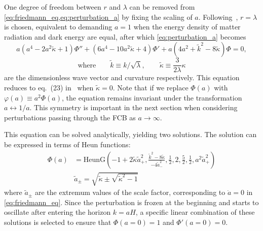 \documentclass[%
 reprint,
 amsmath,amssymb,
 prl,
]{revtex4-2}
\begin{document}
One degree of freedom between \(r\) and \(\lambda\) can be removed from \cref{eq:friedmann_eq,eq:perturbation_a} by fixing the scaling of \(a\). Following~\cite{2022PhRvD.105h3514L}, \(r = \lambda\) is chosen, equivalent to demanding \(a=1\) when the energy density of matter radiation and dark energy are equal, after which \cref{eq:perturbation_a} becomes
\begin{equation}\label{eq:Phi_ODE}
    a(a^4 - 2a^2 \tilde\kappa + 1) \Phi'' + (6a^4- 10a^2 \tilde\kappa + 4 ) \Phi' + a(4a^2 + \tilde{k}^2-8\tilde\kappa) \Phi = 0, \nonumber
\end{equation}
\vspace{-2.5em}
\[ \text{where} \qquad
    \tilde{k} \equiv k/\sqrt{\lambda}, \qquad \tilde \kappa \equiv \frac{3}{2\lambda}\kappa\]
are the dimensionless wave vector and curvature respectively. This equation reduces to eq.~(23) in~\citet{2022PhRvD.105h3514L} when \( \tilde\kappa = 0 \).
Note that if we replace \(\Phi(a)\) with \(\varphi(a) \equiv a^2 \Phi(a)\), the equation remains invariant under the transformation \({a\leftrightarrow1/a}\). This symmetry is important in the next section when considering perturbations passing through the FCB as \(a\rightarrow \infty\).

This equation can be solved analytically, yielding two solutions. The solution can be expressed in terms of Heun functions:
\begin{equation}
\begin{aligned}\label{eq:Heun}
    \Phi(a) &= \text{HeunG} \left( -1+2\tilde\kappa \tilde a_+^2,\frac{\tilde k^2-8\tilde\kappa}{-4 \tilde a_-^2},\frac{1}{2},2, \frac{5}{2},\frac{1}{2},a^2\tilde a_+^2\right)\\
    &\tilde a_{\pm}=\sqrt{\tilde\kappa\pm\sqrt{\tilde\kappa^2-1}}
\end{aligned}
\end{equation}
where \(\tilde a_{\pm}\) are the extremum values of the scale factor, corresponding to \(\dot{a}=0\) in \cref{eq:friedmann_eq}. Since the perturbation is frozen at the beginning and starts to oscillate after entering the horizon \(k = aH\), a specific linear combination of these solutions is selected to ensure that \(\Phi(a =0) = 1\) and \(\Phi'(a = 0) = 0\).
\end{document}
